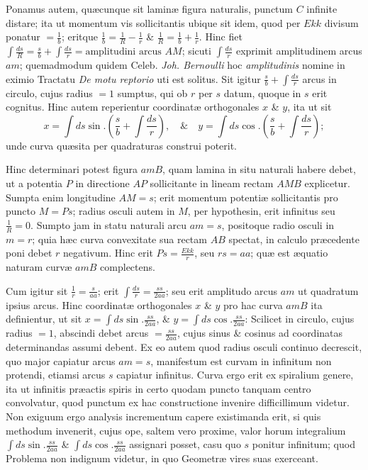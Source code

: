 Ponamus autem, quæcunque sit laminæ figura naturalis, punctum $C$ infinite distare; ita ut momentum vis sollicitantis ubique sit idem, quod per $Ekk$ divisum ponatur $=\frac1b$; eritque $\frac1b=\frac1R-\frac1r$ \& $\frac1R=\frac1b+\frac1r$. Hinc fiet $\int\frac{ds}R=\frac sb+\int\frac{ds}r=\text{amplitudini arcus }AM$; sicuti $\int\frac{ds}r$ exprimit amplitudinem arcus $am$; quemadmodum quidem Celeb. \textit{Joh. Bernoulli} hoc \textit{amplitudinis} nomine in eximio Tractatu \textit{De motu reptorio} uti est solitus. Sit igitur $\frac sb+\int\frac{ds}r$ arcus in circulo, cujus radius $=1$ sumptus, qui ob $r$ per $s$ datum, quoque in $s$ erit cognitus. Hinc autem reperientur coordinatæ orthogonales $x$ \& $y$, ita ut sit
\[x=\int ds\sin.\left(\frac sb+\int\frac{ds}r\right),\quad\&\quad y=\int ds\cos.\left(\frac sb+\int\frac{ds}r\right);\]
unde curva quæsita per quadraturas construi poterit.

Hinc determinari potest figura $amB$, quam lamina in situ naturali habere debet, ut a potentia $P$ in directione $AP$ sollicitante in lineam rectam $AMB$ explicetur. Sumpta enim longitudine $AM=s$; erit momentum potentiæ sollicitantis pro puncto $M=Ps$; radius osculi autem in $M$, per hypothesin, erit infinitus seu $\frac1R=0$. Sumpto jam in statu naturali arcu $am=s$, positoque radio osculi in $m=r$; quia hæc curva convexitate sua rectam $AB$ spectat, in calculo præcedente poni debet $r$ negativum. Hinc erit $Ps=\frac{Ekk}r$, seu $rs=aa$; quæ est æquatio naturam curvæ $amB$ complectens.

Cum igitur sit $\frac1r=\frac s{aa}$; erit $\int\frac{ds}r=\frac{ss}{2aa}$; seu erit amplitudo arcus $am$ ut quadratum ipsius arcus. Hinc coordinatæ orthogonales $x$ \& $y$ pro hac curva $amB$ ita definientur, ut sit $x=\int ds\sin.\frac{ss}{2aa}$, \& $y=\int ds\cos.\frac{ss}{2aa}$: Scilicet in circulo, cujus radius $=1$, abscindi debet arcus $=\frac{ss}{2aa}$, cujus sinus \& cosinus ad coordinatas determinandas assumi debent. Ex eo autem quod radius osculi continuo decrescit, quo major capiatur arcus $am=s$, manifestum est curvam in infinitum non protendi, etiamsi arcus $s$ capiatur infinitus. Curva ergo erit ex spiralium genere, ita ut infinitis præactis spiris in certo quodam puncto tanquam centro convolvatur, quod punctum ex hac constructione invenire difficillimum videtur. Non exiguum ergo analysis incrementum capere existimanda erit, si quis methodum invenerit, cujus ope, saltem vero proxime, valor horum integralium $\int ds\sin.\frac{ss}{2aa}$ \& $\int ds\cos.\frac{ss}{2aa}$ assignari posset, casu quo $s$ ponitur infinitum; quod Problema non indignum videtur, in quo Geometræ vires suas exerceant.

